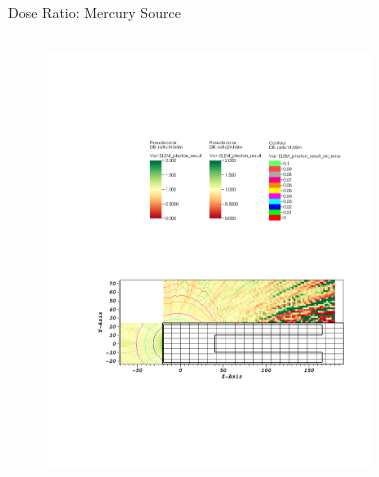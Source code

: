 \documentclass{beamer}
\begin{document}
\begin{frame}{Dose Ratio: Mercury Source}
\begin{columns}[T]
        \begin{figure}
                \includegraphics[scale=0.49,trim={6.75cm 16.5cm 11cm 6cm},clip]{figs/ratio_mer_novoid.pdf}
        \end{figure}
        \begin{figure}

\end{figure}
\end{columns}
\end{frame}
\end{document}
